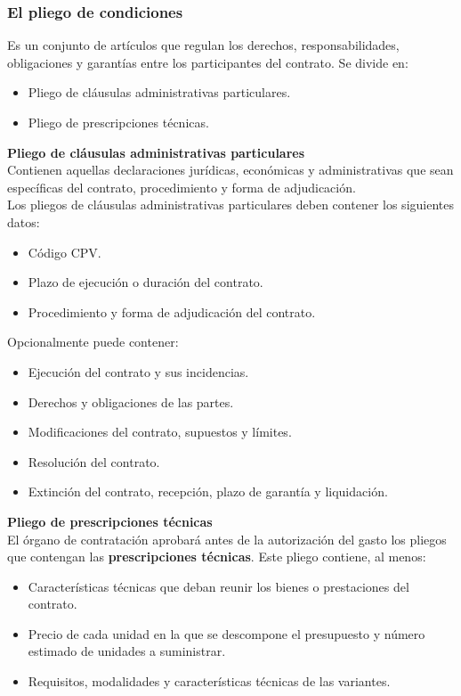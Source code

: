 \documentclass[12pt,spanish]{article}
\begin{document}
\subsubsection{El pliego de condiciones}

Es un conjunto de artículos que regulan los derechos, responsabilidades, obligaciones y garantías entre los participantes del contrato. Se divide en:
\begin{itemize}
	\item Pliego de cláusulas administrativas particulares.
	\item Pliego de prescripciones técnicas.
\end{itemize}

\textbf{Pliego de cláusulas administrativas particulares}\\

Contienen aquellas declaraciones jurídicas, económicas y administrativas que sean específicas del contrato, procedimiento y forma de adjudicación.\\

Los pliegos de cláusulas administrativas particulares deben contener los siguientes datos:

\begin{itemize}
	\item Código CPV.
	\item Plazo de ejecución o duración del contrato.
	\item Procedimiento y forma de adjudicación del contrato.
\end{itemize}

Opcionalmente puede contener:

\begin{itemize}
	\item Ejecución del contrato y sus incidencias.
	\item Derechos y obligaciones de las partes.
	\item Modificaciones del contrato, supuestos y límites.
	\item Resolución del contrato.
	\item Extinción del contrato, recepción, plazo de garantía y liquidación.
\end{itemize}

\textbf{Pliego de prescripciones técnicas}\\

El órgano de contratación aprobará antes de la autorización del gasto los pliegos que contengan las \textbf{prescripciones técnicas}. Este pliego contiene, al menos:
\begin{itemize}
	\item Características técnicas que deban reunir los bienes o prestaciones del contrato.
	\item Precio de cada unidad en la que se descompone el presupuesto y número estimado de unidades a suministrar.
	\item Requisitos, modalidades y características técnicas de las variantes.
\end{itemize}
\end{document}
